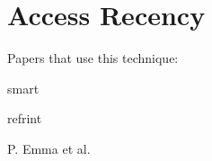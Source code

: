 \section{Access Recency}
\label{sec:acc}

Papers that use this technique:

smart\cite{smart}

refrint\cite{refrint}

P. Emma et al.